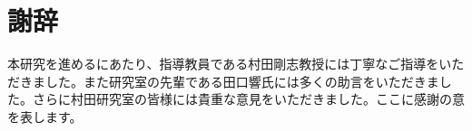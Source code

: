 \chapter{謝辞}
本研究を進めるにあたり、指導教員である村田剛志教授には丁寧なご指導をいただきました。また研究室の先輩である田口響氏には多くの助言をいただきました。さらに村田研究室の皆様には貴重な意見をいただきました。ここに感謝の意を表します。
